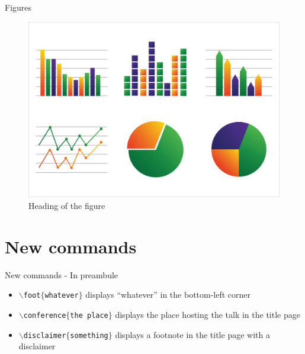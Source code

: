 \documentclass[numbertotal,toc,wide]{bpslides}
\begin{document}
\begin{frame}{Figures}
	\begin{figure}
		\centering
		\caption{Heading of the figure}
		\includegraphics[width=0.9\paperheight]{graph}
	\end{figure}
\end{frame}

\section{New commands}

\begin{frame}{New commands - In preambule}
	\begin{itemize}
		\item \texttt{$\backslash$foot$\{$whatever$\}$} displays ``whatever'' in the bottom-left corner
		\item \texttt{$\backslash$conference$\{$the place$\}$} displays the place hosting the talk in the title page
		\item \texttt{$\backslash$disclaimer$\{$something$\}$} displays a footnote in the title page with a disclaimer
	\end{itemize}
\end{frame}
\end{document}
